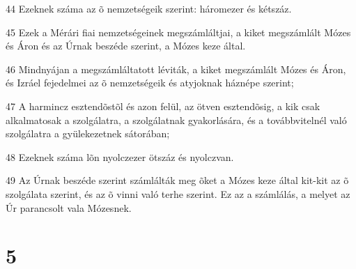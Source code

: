 \par 44 Ezeknek száma az õ nemzetségeik szerint: háromezer és kétszáz.
\par 45 Ezek a Mérári fiai nemzetségeinek megszámláltjai, a kiket megszámlált Mózes és Áron és az Úrnak beszéde szerint, a Mózes keze által.
\par 46 Mindnyájan a megszámláltatott léviták, a kiket megszámlált Mózes és Áron, és Izráel fejedelmei az õ nemzetségeik és atyjoknak háznépe szerint;
\par 47 A harmincz esztendõstõl és azon felül, az ötven esztendõsig, a kik csak alkalmatosak a szolgálatra, a szolgálatnak gyakorlására, és a továbbvitelnél való szolgálatra a gyülekezetnek sátorában;
\par 48 Ezeknek száma lõn nyolczezer ötszáz és nyolczvan.
\par 49 Az Úrnak beszéde szerint számlálták meg õket a Mózes keze által kit-kit az õ szolgálata szerint, és az õ vinni való terhe szerint. Ez az a számlálás, a melyet az Úr parancsolt vala Mózesnek.

\chapter{5}

